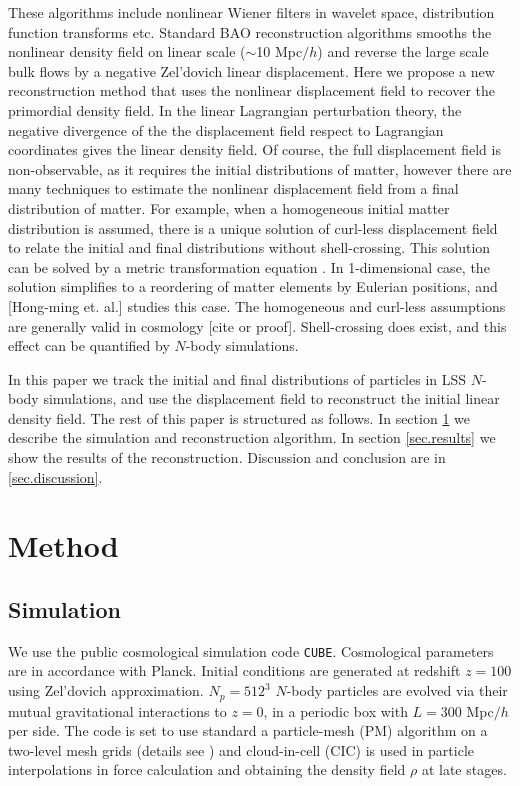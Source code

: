 \documentclass[aps,prd,twocolumn,superscriptaddress,amsfont,amssymb,amsmath,nofootinbib,showpacs,balancelastpage]{revtex4-1}
\begin{document}
These algorithms include nonlinear Wiener filters in wavelet space, distribution function transforms etc. Standard BAO reconstruction algorithms smooths the nonlinear density field on linear scale ($\sim$10 Mpc$/h$) and reverse the large scale bulk flows by a negative Zel'dovich linear displacement. Here we propose a new reconstruction method that uses the nonlinear displacement field to recover the primordial density field. In the linear Lagrangian perturbation theory, the negative divergence of the the displacement field respect to Lagrangian coordinates gives the linear density field. Of course, the full displacement field is non-observable, as it requires the initial distributions of matter, however there are many techniques to estimate the nonlinear displacement field from a final distribution of matter. For example, when a homogeneous initial matter distribution is assumed, there is a unique solution of curl-less displacement field to relate the initial and final distributions without shell-crossing. This solution can be solved by a metric transformation equation \citep{1995ApJS..100..269P,1998ApJS..115...19P}. In 1-dimensional case, the solution simplifies to a reordering of matter elements by Eulerian positions, and [Hong-ming et. al.] studies this case. The homogeneous and curl-less assumptions are generally valid in cosmology [cite or proof]. Shell-crossing does exist, and this effect can be quantified by $N$-body simulations.

In this paper we track the initial and final distributions of particles in LSS $N$-body simulations, and use the displacement field to reconstruct the initial linear density field. The rest of this paper is structured as follows. In section \ref{sec.method} we describe the simulation and reconstruction algorithm. In section \ref{sec.results} we show the results of the reconstruction. Discussion and conclusion are in \ref{sec.discussion}.



\section{Method}\label{sec.method}

\subsection{Simulation}
We use the public cosmological simulation code {\tt CUBE}. Cosmological parameters are in accordance with Planck. Initial conditions are generated at redshift $z=100$ using Zel'dovich approximation. $N_p=512^3$ $N$-body particles are evolved via their mutual gravitational interactions to $z=0$, in a periodic box with $L=300$ Mpc$/h$ per side. The code is set to use standard a particle-mesh (PM) algorithm \cite{1988csup.book.....H} on a two-level mesh grids (details see \cite{2013MNRAS.436..540H}) and cloud-in-cell (CIC) is used in particle interpolations in force calculation and obtaining the density field $\rho$ at late stages. 
\end{document}
